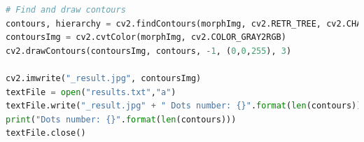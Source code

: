 \documentclass[fontsize=12bp, paper=a4]{scrarticle}
\renewcommand\lstlistingname{Implementacija}
\renewcommand\lstlistlistingname{Implementacija}
\begin{document}
\begin{lstlisting}[language=Python, caption={Nalaze se konture, konverzija boja, crtanje kontura, dostavljanje izlaznog fajla slike, ispis broja kontura}]     
    # Find and draw contours
contours, hierarchy = cv2.findContours(morphImg, cv2.RETR_TREE, cv2.CHAIN_APPROX_SIMPLE)
contoursImg = cv2.cvtColor(morphImg, cv2.COLOR_GRAY2RGB)
cv2.drawContours(contoursImg, contours, -1, (0,0,255), 3)

cv2.imwrite("_result.jpg", contoursImg)
textFile = open("results.txt","a")
textFile.write("_result.jpg" + " Dots number: {}".format(len(contours)) + "\n")
print("Dots number: {}".format(len(contours)))
textFile.close()
\end{lstlisting}
\newpage

\renewcommand\lstlistingname{Izlaz}
\renewcommand\lstlistlistingname{Izlaz}
\setcounter{lstlisting}{0}
\end{document}
